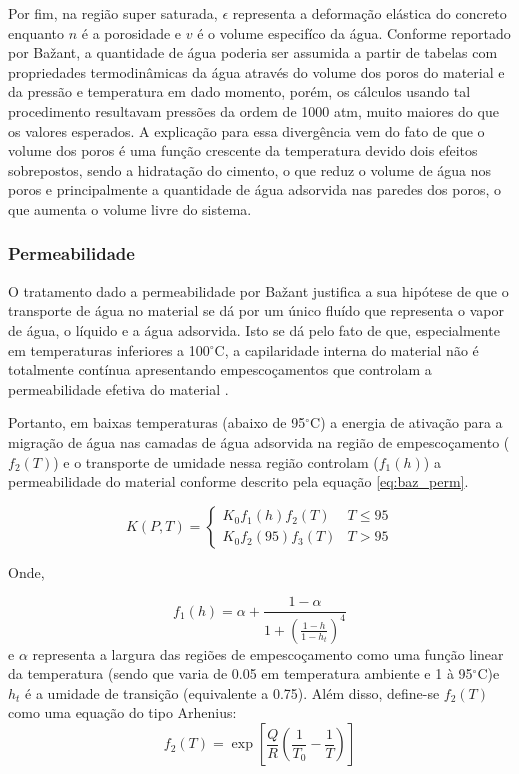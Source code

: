 Por fim, na região super saturada, $\epsilon$ representa a deformação elástica
do concreto enquanto $n$ é a porosidade e $v$ é o volume especifíco da água.
Conforme reportado por Ba\v{z}ant, a quantidade de água poderia ser assumida a
partir de tabelas com propriedades termodinâmicas da água através do volume dos
poros do material e da pressão e temperatura em dado momento, porém, os cálculos
usando tal procedimento resultavam pressões da ordem de 1000 atm, muito maiores
do que os valores esperados. A explicação para essa divergência vem do fato de
que o volume dos poros é uma função crescente da temperatura devido dois efeitos
sobrepostos, sendo a hidratação do cimento, o que reduz o volume de água nos
poros e principalmente a quantidade de água adsorvida nas paredes dos
poros, o que aumenta o volume livre do sistema.

\subsubsection{Permeabilidade}
O tratamento dado a permeabilidade por Ba\v{z}ant justifica a sua hipótese de
que o transporte de água no material se dá por um único fluído que representa o
vapor de água, o líquido e a água adsorvida. Isto se dá pelo fato de que,
especialmente em temperaturas inferiores a 100$^{\circ}$C, a capilaridade interna
do material não é totalmente contínua apresentando empescoçamentos que controlam
a permeabilidade efetiva do material \cite{bazant1978}.

Portanto, em baixas temperaturas (abaixo de 95$^{\circ}$C) a energia de ativação
para a migração de água nas camadas de água adsorvida na região de
empescoçamento ($f_2(T)$) e o transporte de umidade nessa região controlam
($f_1(h)$) a permeabilidade do material conforme descrito pela equação
\ref{eq:baz_perm}.
    
\begin{equation}
  \label{eq:baz_perm}
  K(P, T) =
  \begin{cases} 
    K_0 f_1(h) f_2(T) & T \leq 95 \\
    K_0 f_2(95) f_3(T) & T > 95
  \end{cases}
\end{equation}

Onde,

\begin{equation}
  \label{eq:f1}
  f_1(h) = \alpha + \frac{1-\alpha}{1+\left(\frac{1-h}{1-h_t}\right)^4} 
\end{equation}
e $\alpha$ representa a largura das regiões de empescoçamento como uma função
linear da temperatura (sendo que varia de 0.05 em temperatura ambiente e 1 à
95$^{\circ}$C)e $h_t$ é a umidade de transição (equivalente a 0.75). Além disso,
define-se $f_2(T)$ como uma equação do tipo Arhenius:
\begin{equation}
  \label{eq:f2}
  f_2(T)  = \exp{\left[\frac{Q}{R}\left( \frac{1}{T_0} - \frac{1}{T} \right) \right]}
\end{equation}
    
